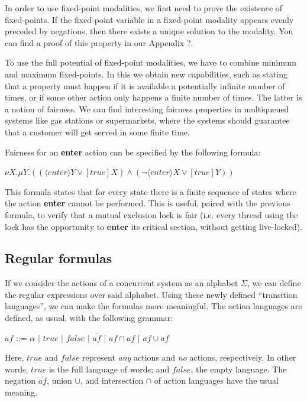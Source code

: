 \documentclass[11pt]{article}
\theoremstyle{definition}
\theoremstyle{plain}
\theoremstyle{definition}
\begin{document}
In order to use fixed-point modalities, we first need to prove the existence of fixed-points. If the fixed-point variable in a fixed-point modality appears evenly preceded by negations, then there exists a unique solution to the modality. You can find a proof of this property in our Appendix ?.

To use the full potential of fixed-point modalities, we have to combine minimum and maximum fixed-points. In this we obtain new capabilities, such as stating that a property must happen if it is available a potentially infinite number of times, or if some other action only happens a finite number of times. The latter is a notion of fairness. We can find interesting fairness properties in multiqueued systems like gas stations or supermarkets, where the systems should guarantee that a customer will get served in some finite time.

Fairness for an \textbf{enter} action can be specified by the following formula:

\begin{center}
	$ \nu X. \mu Y. ((\langle enter\rangle Y \vee [true]X) \wedge (\neg \langle enter \rangle X \vee [true] Y)) $
\end{center}

This formula states that for every state there is a finite sequence of states where the action \textbf{enter} cannot be performed. This is useful, paired with the previous formula, to verify that a mutual exclusion lock is fair (i.e. every thread using the lock has the opportunity to \textbf{enter} its critical section, without getting live-locked).

\subsection{Regular formulas}
If we consider the actions of a concurrent system as an alphabet $\Sigma$, we can define the regular expressions over said alphabet. Using these newly defined “transition languages”, we can make the formulas more meaningful.
The action languages are defined, as usual, with the following grammar:
\begin{center}
	$ af $ ::= $\alpha$ $ \vert $ $true$ $ \vert $ $false$ $ \vert $ $ \overline{af}$ $ \vert $ $af \cap af $ $ \vert $ $af \cup af$
\end{center}
Here, $ true $ and $ false $ represent \emph{any} actions and \emph{no} actions, respectively. In other words, $ true $ is the full language of words; and $ false $, the empty language. The negation $ \overline{af} $, union $ \cup $, and intersection $ \cap $ of action languages have the usual meaning.
\end{document}
